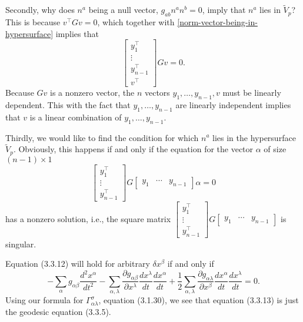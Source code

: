 \documentclass{note}
\numberwithin{equation}{chapter}
\begin{document}
Secondly, why does $n^a$ being a null vector, $g_{ab}n^a n^b = 0$, imply that
$n^a$ lies in $\tilde{V}_p$? This is because $v^\top Gv = 0$, which together
with \eqref{norm-vector-being-in-hypersurface} implies that
\begin{equation*}
    \begin{bmatrix}
        y_1^\top     \\
        \vdots       \\
        y_{n-1}^\top \\
        v^\top
    \end{bmatrix}
    Gv = 0.
\end{equation*}
Because $Gv$ is a nonzero vector, the $n$ vectors $y_1, \dots, y_{n-1}, v$ must
be linearly dependent. This with the fact that $y_1, \dots, y_{n-1}$ are
linearly independent implies that $v$ is a linear combination of $y_1, \dots,
    y_{n-1}$.

Thirdly, we would like to find the condition for which $n^a$ lies in the
hypersurface $\tilde{V}_p$. Obviously, this happens if and only if the equation
for the vector $\alpha$ of size $(n-1)\times1$
\begin{equation*}
    \begin{bmatrix}
        y_1^\top \\
        \vdots   \\
        y_{n-1}^\top
    \end{bmatrix}
    G
    \begin{bmatrix}
        y_1 & \cdots & y_{n-1}
    \end{bmatrix}\alpha = 0
\end{equation*}
has a nonzero solution, i.e., the square matrix $\begin{bmatrix}
        y_1^\top \\
        \vdots   \\
        y_{n-1}^\top
    \end{bmatrix}
    G
    \begin{bmatrix}
        y_1 & \cdots & y_{n-1}
    \end{bmatrix}$ is singular.


\begin{quotebox}
    Equation (3.3.12) will hold for arbitrary $ \delta x^\beta$ if and only if
    \begin{equation*}
        - \sum_{\alpha} g_{\alpha\beta} \frac{d^2 x^\alpha}{dt^2}
        - \sum_{\alpha, \lambda} \frac{\partial g_{\alpha\beta}}{\partial x^\lambda} \frac{dx^\lambda}{dt} \frac{dx^\alpha}{dt}
        + \frac{1}{2} \sum_{\alpha, \lambda} \frac{\partial g_{\alpha\lambda}}{\partial x^\beta} \frac{dx^\alpha}{dt} \frac{dx^\lambda}{dt} = 0.
    \end{equation*}
    Using our formula for $\Gamma^\sigma_{\alpha\lambda}$, equation (3.1.30), we
    see that equation (3.3.13) is just the geodesic equation (3.3.5).
\end{quotebox}
\end{document}

